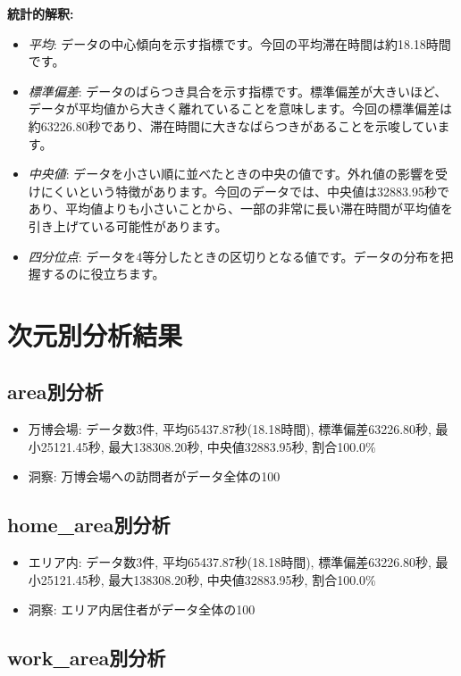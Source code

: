 \documentclass[11pt,a4paper]{article}
\begin{document}
\textbf{統計的解釈:}
\begin{itemize}
    \item \textit{平均}: データの中心傾向を示す指標です。今回の平均滞在時間は約18.18時間です。
    \item \textit{標準偏差}: データのばらつき具合を示す指標です。標準偏差が大きいほど、データが平均値から大きく離れていることを意味します。今回の標準偏差は約63226.80秒であり、滞在時間に大きなばらつきがあることを示唆しています。
    \item \textit{中央値}: データを小さい順に並べたときの中央の値です。外れ値の影響を受けにくいという特徴があります。今回のデータでは、中央値は32883.95秒であり、平均値よりも小さいことから、一部の非常に長い滞在時間が平均値を引き上げている可能性があります。
    \item \textit{四分位点}: データを4等分したときの区切りとなる値です。データの分布を把握するのに役立ちます。
\end{itemize}

\section{次元別分析結果}

\subsection{area別分析}

\begin{itemize}
    \item 万博会場: データ数3件, 平均65437.87秒(18.18時間), 標準偏差63226.80秒, 最小25121.45秒, 最大138308.20秒, 中央値32883.95秒, 割合100.0\%
    \item 洞察: 万博会場への訪問者がデータ全体の100%
\end{itemize}

\subsection{home\_area別分析}

\begin{itemize}
    \item エリア内: データ数3件, 平均65437.87秒(18.18時間), 標準偏差63226.80秒, 最小25121.45秒, 最大138308.20秒, 中央値32883.95秒, 割合100.0\%
    \item 洞察: エリア内居住者がデータ全体の100%
\end{itemize}

\subsection{work\_area別分析}
\end{document}
